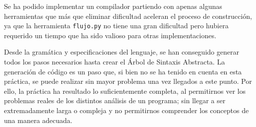 \documentclass[11pt]{article}
\begin{document}
Se ha podido implementar un compilador partiendo con apenas algunas herramientas que más que eliminar dificultad aceleran el proceso de construcción, ya que la herramienta \lstinline[language=Python]{flujo.py} no tiene una gran dificultad pero hubiera requerido un tiempo que ha sido valioso para otras implementaciones. 

Desde la gramática y especificaciones del lenguaje, se han conseguido generar todos los pasos necesarios hasta crear el Árbol de Sintaxis Abstracta. La generación de código es un paso que, si bien no se ha tenido en cuenta en esta práctica, se puede realizar sin mayor problema una vez llegados a este punto. Por ello, la práctica ha resultado lo suficientemente completa, al permitirnos ver los problemas reales de los distintos análisis de un programa; sin llegar a ser extremadamente larga o compleja y no permitirnos comprender los conceptos de una manera adecuada.
\end{document}
